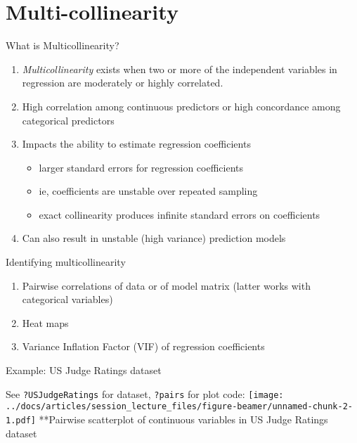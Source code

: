 \documentclass[
  ignorenonframetext,
]{beamer}
\providecommand{\tightlist}{%
  \setlength{\itemsep}{0pt}\setlength{\parskip}{0pt}}
\begin{document}
\hypertarget{multi-collinearity}{%
\section{Multi-collinearity}\label{multi-collinearity}}

\begin{frame}{What is Multicollinearity?}
\protect\hypertarget{what-is-multicollinearity}{}

\begin{enumerate}
\tightlist
\item
  \emph{Multicollinearity} exists when two or more of the independent
  variables in regression are moderately or highly correlated.
\item
  High correlation among continuous predictors or high concordance among
  categorical predictors
\item
  Impacts the ability to estimate regression coefficients

  \begin{itemize}
  \tightlist
  \item
    larger standard errors for regression coefficients
  \item
    ie, coefficients are unstable over repeated sampling
  \item
    exact collinearity produces infinite standard errors on coefficients
  \end{itemize}
\item
  Can also result in unstable (high variance) prediction models
\end{enumerate}

\end{frame}

\begin{frame}{Identifying multicollinearity}
\protect\hypertarget{identifying-multicollinearity}{}

\begin{enumerate}
\tightlist
\item
  Pairwise correlations of data or of model matrix (latter works with
  categorical variables)
\item
  Heat maps
\item
  Variance Inflation Factor (VIF) of regression coefficients
\end{enumerate}

\end{frame}

\begin{frame}[fragile]{Example: US Judge Ratings dataset}
\protect\hypertarget{example-us-judge-ratings-dataset}{}

See \texttt{?USJudgeRatings} for dataset, \texttt{?pairs} for plot code:
\texttt{[image: ../docs/articles/session\_lecture\_files/figure-beamer/unnamed-chunk-2-1.pdf]}
**Pairwise scatterplot of continuous variables in US Judge Ratings
dataset

\end{frame}
\end{document}
